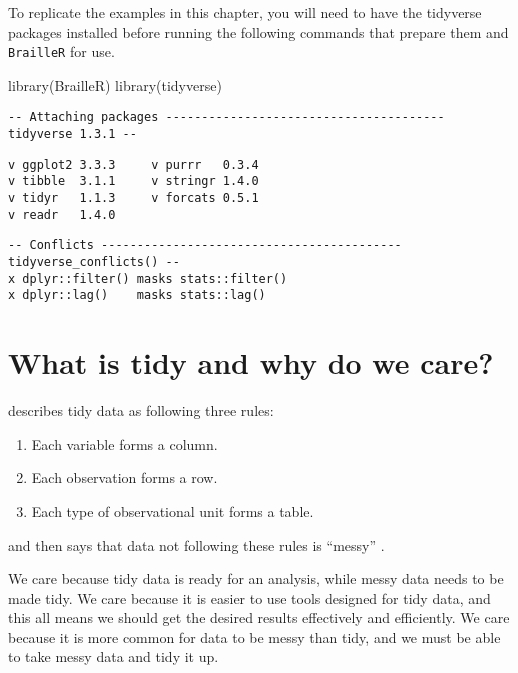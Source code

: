 \documentclass[
]{book}
\newenvironment{Shaded}{\begin{snugshade}}{\end{snugshade}}
\newcommand{\FunctionTok}[1]{\textcolor[rgb]{0.00,0.00,0.00}{#1}}
\newcommand{\NormalTok}[1]{#1}
\providecommand{\tightlist}{%
  \setlength{\itemsep}{0pt}\setlength{\parskip}{0pt}}
\begin{document}
To replicate the examples in this chapter, you will need to have the tidyverse packages installed before running the following commands that prepare them and \texttt{BrailleR} for use.

\begin{Shaded}
\begin{Highlighting}[]
\FunctionTok{library}\NormalTok{(BrailleR)   }
\FunctionTok{library}\NormalTok{(tidyverse)}
\end{Highlighting}
\end{Shaded}

\begin{verbatim}
-- Attaching packages --------------------------------------- tidyverse 1.3.1 --
\end{verbatim}

\begin{verbatim}
v ggplot2 3.3.3     v purrr   0.3.4
v tibble  3.1.1     v stringr 1.4.0
v tidyr   1.1.3     v forcats 0.5.1
v readr   1.4.0     
\end{verbatim}

\begin{verbatim}
-- Conflicts ------------------------------------------ tidyverse_conflicts() --
x dplyr::filter() masks stats::filter()
x dplyr::lag()    masks stats::lag()
\end{verbatim}

\hypertarget{what-is-tidy-and-why-do-we-care}{%
\section{What is tidy and why do we care?}\label{what-is-tidy-and-why-do-we-care}}

\citet{Wickham2014Tidy} describes tidy data as following three rules:

\begin{enumerate}
\def\labelenumi{\arabic{enumi}.}
\tightlist
\item
  Each variable forms a column.
\item
  Each observation forms a row.
\item
  Each type of observational unit forms a table.
\end{enumerate}

and then says that data not following these rules is ``messy'' \citep{Wickham2014Tidy} .

We care because tidy data is ready for an analysis, while messy data needs to be made tidy. We care because it is easier to use tools designed for tidy data, and this all means we should get the desired results effectively and efficiently. We care because it is more common for data to be messy than tidy, and we must be able to take messy data and tidy it up.
\end{document}
